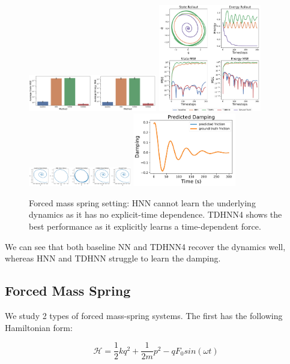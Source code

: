 \documentclass[twoside]{article}
\begin{document}
\begin{figure}[h!]
\centering
\includegraphics[width=0.5\textwidth]{figures/damped_1_errors.pdf}
\includegraphics[width=0.4\textwidth]{figures/damped_1_pred.pdf}
\includegraphics[width=0.4\textwidth]{figures/damped_rollout.pdf}
\includegraphics[width=0.4\textwidth]{figures/TDHNN4_damped_1.pdf}
\caption{Forced mass spring setting: HNN cannot learn the underlying dynamics as it has no explicit-time dependence. TDHNN4 shows the best performance as it explicitly learns a time-dependent force.}
\end{figure}

We can see that both baseline NN and TDHNN4 recover the dynamics well, whereas HNN and TDHNN struggle to learn the damping.

\subsection{Forced Mass Spring}

 We study 2 types of forced mass-spring systems. The first has the following Hamiltonian form:

\begin{equation}
\mathcal{H} = \frac{1}{2}kq^2 + \frac{1}{2m}p^2 - qF_0sin(\omega t) 
\end{equation}
\end{document}
